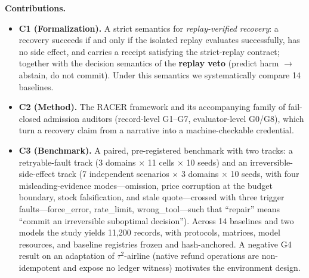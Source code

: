\documentclass[review]{fcs}
\begin{document}
\textbf{Contributions.}

\begin{itemize}

  \item \textbf{C1 (Formalization).} A strict semantics for \emph{replay-verified recovery}: a recovery succeeds if and only if the isolated replay evaluates successfully, has no side effect, and carries a receipt satisfying the strict-replay contract; together with the decision semantics of the \textbf{replay veto} (predict harm $\to$ abstain, do not commit). Under this semantics we systematically compare 14 baselines.

  \item \textbf{C2 (Method).} The RACER framework and its accompanying family of fail-closed admission auditors (record-level G1--G7, evaluator-level G0/G8), which turn a recovery claim from a narrative into a machine-checkable credential.

  \item \textbf{C3 (Benchmark).} A paired, pre-registered benchmark with two tracks: a retryable-fault track (3 domains $\times$ 11 cells $\times$ 10 seeds) and an irreversible-side-effect track (7 independent scenarios $\times$ 3 domains $\times$ 10 seeds, with four misleading-evidence modes---omission, price corruption at the budget boundary, stock falsification, and stale quote---crossed with three trigger faults---force\_error, rate\_limit, wrong\_tool---such that ``repair'' means ``commit an irreversible suboptimal decision''). Across 14 baselines and two models the study yields 11,200 records, with protocols, matrices, model resources, and baseline registries frozen and hash-anchored. A negative G4 result on an adaptation of $\tau^{2}$-airline (native refund operations are non-idempotent and expose no ledger witness) motivates the environment design.


\end{itemize}
\end{document}
